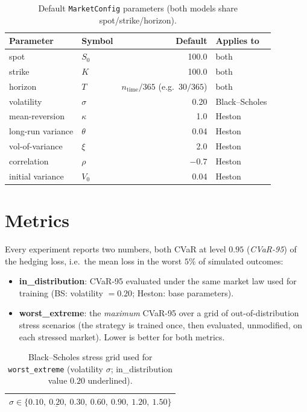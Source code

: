 \documentclass[11pt]{article}
\begin{document}
\begin{table}[h]
  \centering
  \caption{Default \texttt{MarketConfig} parameters (both models share spot/strike/horizon).}
  \label{tab:market-defaults}
  \begin{tabular}{llrl}
    \toprule
    Parameter & Symbol & Default & Applies to \\
    \midrule
    spot & $S_0$ & 100.0 & both \\
    strike & $K$ & 100.0 & both \\
    horizon & $T$ & $n_{\mathrm{time}}/365$ (e.g.\ $30/365$) & both \\
    volatility & $\sigma$ & 0.20 & Black--Scholes \\
    mean-reversion & $\kappa$ & 1.0 & Heston \\
    long-run variance & $\theta$ & 0.04 & Heston \\
    vol-of-variance & $\xi$ & 2.0 & Heston \\
    correlation & $\rho$ & $-0.7$ & Heston \\
    initial variance & $V_0$ & 0.04 & Heston \\
    \bottomrule
  \end{tabular}
\end{table}

\section{Metrics}

Every experiment reports two numbers, both CVaR at level $0.95$ (\emph{CVaR-95}) of the hedging
loss, i.e.\ the mean loss in the worst $5\%$ of simulated outcomes:

\begin{itemize}
  \item \textbf{in\_distribution}: CVaR-95 evaluated under the same market law used for
    training (BS: volatility $=0.20$; Heston: base parameters).
  \item \textbf{worst\_extreme}: the \emph{maximum} CVaR-95 over a grid of out-of-distribution
    stress scenarios (the strategy is trained once, then evaluated, unmodified, on each stressed
    market). Lower is better for both metrics.
\end{itemize}

\begin{table}[h]
  \centering
  \caption{Black--Scholes stress grid used for \texttt{worst\_extreme} (volatility $\sigma$;
  in\_distribution value $0.20$ underlined).}
  \begin{tabular}{l}
    \toprule
    $\sigma \in \{0.10,\ \underline{0.20},\ 0.30,\ 0.60,\ 0.90,\ 1.20,\ 1.50\}$ \\
    \bottomrule
  \end{tabular}
\end{table}
\end{document}
